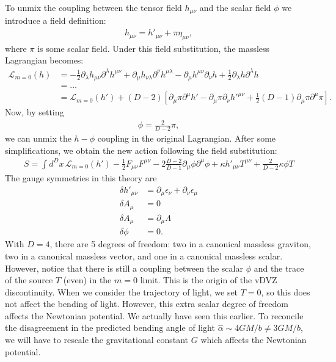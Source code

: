 \documentclass{book}
\theoremstyle{definition}
\newcommand{\p}{\partial}
\newcommand{\lag}{\mathcal{L}}
\newcommand{\nn}{\nonumber}
\newcommand{\f}[2]{\frac{#1}{#2}}
\newcommand{\lb}{\left[}
\newcommand{\rb}{\right]}
\begin{document}
To unmix the coupling between the tensor field $h_{\mu\nu}$ and the scalar field $\phi$ we introduce a field definition:
\begin{align}
h_{\mu\nu} = h'_{\mu\nu} + \pi \eta_{\mu\nu},
\end{align}
where $\pi$ is some scalar field. Under this field substitution, the massless Lagrangian becomes:
\begin{align}
\lag_{m=0}(h) &= -\f{1}{2}\p_\lambda h_{\mu\nu} \p^\lambda h^{\mu\nu} + \p_\mu h_{\nu\lambda}\p^\nu h^{\mu\lambda} - \p_\mu h^{\mu\nu}\p_\nu h + \f{1}{2}\p_\lambda h \p^\lambda h \nn\\
&= \dots\nn\\
&= \lag_{m=0}(h') + (D-2)\lb \p_\mu \pi \p^\mu h' - \p_\mu \pi \p_\nu h'^{\mu\nu} + \f{1}{2}(D-1)\p_\mu \pi \p^\mu \pi \rb.
\end{align}
Now, by setting
\begin{align}
\phi = \f{2}{D-2}\pi,
\end{align}
we can unmix the $h-\phi$ coupling in the original Lagrangian. After some simplifications, we obtain the new action following the field substitution:
\begin{align}
\boxed{S = \int d^Dx\,\lag_{m=0}(h') - \f{1}{2}F_{\mu\nu}F^{\mu\nu} - 2\f{D-2}{D-1}\p_\mu \phi \p^\mu \phi + \kappa h'_{\mu\nu}T^{\mu\nu} + \f{2}{D-2}\kappa \phi T}
\end{align}
The gauge symmetries in this theory are
\begin{align}
\delta h'_{\mu\nu} &= \p_\mu \epsilon_\nu + \p_\nu \epsilon_\mu \nn\\
\delta A_\mu &= 0\nn\\
\delta A_\mu &= \p_\mu \Lambda\nn\\
\delta \phi &= 0.
\end{align}
With $D=4$, there are 5 degrees of freedom: two in a canonical massless graviton, two in a canonical massless vector, and one in a canonical massless scalar. \\

However, notice that there is still a coupling between the scalar $\phi$ and the trace of the source $T$ (even) in the $m=0$ limit. This is the origin of the vDVZ discontinuity. When we consider the trajectory of light, we set $T=0$, so this does not affect the bending of light. However, this extra scalar degree of freedom affects the Newtonian potential. We actually have seen this earlier. To reconcile the disagreement in the predicted bending angle of light $\hat{\alpha} \sim 4GM/b \neq 3GM/b$, we will have to rescale the gravitational constant $G$ which affects the Newtonian potential.\\
\end{document}
